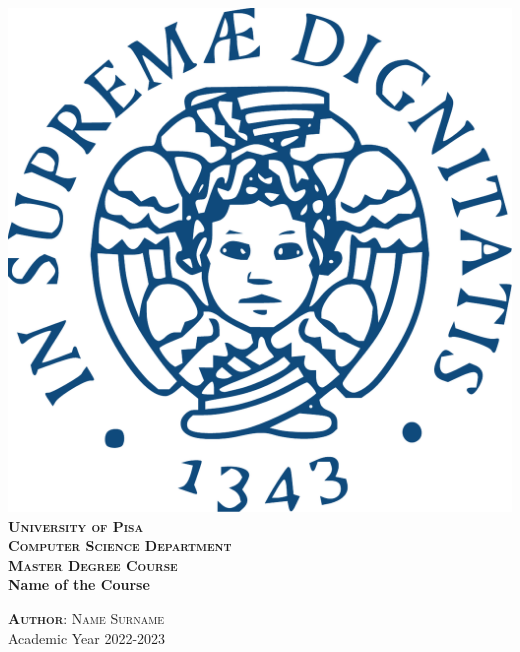 \begin{titlepage}
\changepage{}{}{}{}{}{}{}{}{}
\begin{center}
\includegraphics [width=.2\columnwidth, angle=0]{images/cover/Stemma_unipi}\\ %
\vspace{1cm}
{\LARGE \textbf{\textrm{\textsc{University of Pisa}}}}\\
\vspace{0.5cm}
{\Large \scshape \textrm{\textbf{Computer Science Department}}}\\
\vspace{0.5cm}
{\Large \scshape \textrm{\textbf{Master Degree Course}}} \\
\vspace{5cm}
{\Huge \bfseries Name of the Course} \\
\vspace{5cm}




{\large \textbf{\textrm{\textsc{Author}}}: \textrm{\textsc{Name Surname}}} \\
\vspace{2cm}
{\small Academic Year 2022-2023} %
%
%
\end{center}
\end{titlepage}
